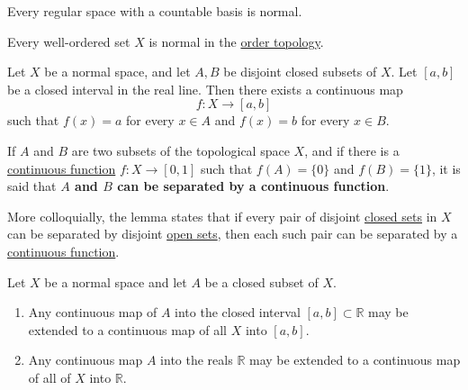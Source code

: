   \begin{theorem}
    \label{thm:regular-with-a-countable-basis-implies-normal}
    Every regular space with a countable basis is normal. 
  \end{theorem}

  \begin{theorem}
    \label{thm:well-ordered-sets-are-normal}
    Every well-ordered set $X$ is normal in the \hyperref[def:order-topology]{order topology}. 
  \end{theorem}

  \begin{theorem}
    \label{thm:urysohn-lemma}
    Let $X$ be a normal space, and let $A, B$ be disjoint closed subsets of $X$. Let $[a,b]$ be a closed interval in the real line. Then there exists a continuous map
    \begin{equation}
      f: X \to [a,b]
    \end{equation}
    such that $f(x) = a$ for every $x \in A$ and $f(x) = b$ for every $x \in B$. 
  \end{theorem}

  \begin{definition}
    \label{def:separation-by-continuous-function}
    If $A$ and $B$ are two subsets of the topological space $X$, and if there is a \hyperref[def:continuous_func]{continuous function} $f: X \to [0,1]$ such that $f(A) = \{0\}$ and $f(B) = \{1\}$, it is said that \textbf{$A$ and $B$ can be separated by a continuous function}. 
  \end{definition}

  More colloquially, the lemma states that if every pair of disjoint \hyperref[def:closed]{closed sets} in $X$ can be separated by disjoint \hyperref[def:open-set]{open sets}, then each such pair can be separated by a \hyperref[def:continuous_func]{continuous function}. 

  \begin{theorem}
    \label{thm:tietze-extension-theorem}
    Let $X$ be a normal space and let $A$ be a closed subset of $X$. 
    \begin{enumerate}
      \item Any continuous map of $A$ into the closed interval $[a,b] \subset \mathbb{R}$ may be extended to a continuous map of all $X$ into $[a,b]$. 
      \item Any continuous map $A$ into the reals $\mathbb{R}$ may be extended to a continuous map of all of $X$ into $\mathbb{R}$. 
    \end{enumerate}
  \end{theorem}


